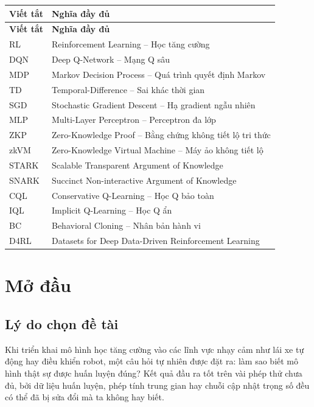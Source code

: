 \documentclass[12pt,a4paper,oneside]{report}
\begin{document}
\begin{longtable}{p{} p{}}
\toprule
\textbf{Viết tắt} & \textbf{Nghĩa đầy đủ} \\
\midrule
\endfirsthead
\toprule
\textbf{Viết tắt} & \textbf{Nghĩa đầy đủ} \\
\midrule
\endhead
RL & Reinforcement Learning -- Học tăng cường \\
DQN & Deep Q-Network -- Mạng Q sâu \\
MDP & Markov Decision Process -- Quá trình quyết định Markov \\
TD & Temporal-Difference -- Sai khác thời gian \\
SGD & Stochastic Gradient Descent -- Hạ gradient ngẫu nhiên \\
MLP & Multi-Layer Perceptron -- Perceptron đa lớp \\
ZKP & Zero-Knowledge Proof -- Bằng chứng không tiết lộ tri thức \\
zkVM & Zero-Knowledge Virtual Machine -- Máy ảo không tiết lộ \\
STARK & Scalable Transparent Argument of Knowledge \\
SNARK & Succinct Non-interactive Argument of Knowledge \\
CQL & Conservative Q-Learning -- Học Q bảo toàn \\
IQL & Implicit Q-Learning -- Học Q ẩn \\
BC & Behavioral Cloning -- Nhân bản hành vi \\
D4RL & Datasets for Deep Data-Driven Reinforcement Learning \\
\bottomrule
\end{longtable}

\clearpage

\setcounter{page}{1}

\chapter{Mở đầu}

\section{Lý do chọn đề tài}

Khi triển khai mô hình học tăng cường vào các lĩnh vực nhạy cảm như lái xe tự động hay điều khiển robot, một câu hỏi tự nhiên được đặt ra: làm sao biết mô hình thật sự được huấn luyện đúng? Kết quả đầu ra tốt trên vài phép thử chưa đủ, bởi dữ liệu huấn luyện, phép tính trung gian hay chuỗi cập nhật trọng số đều có thể đã bị sửa đổi mà ta không hay biết.
\end{document}
